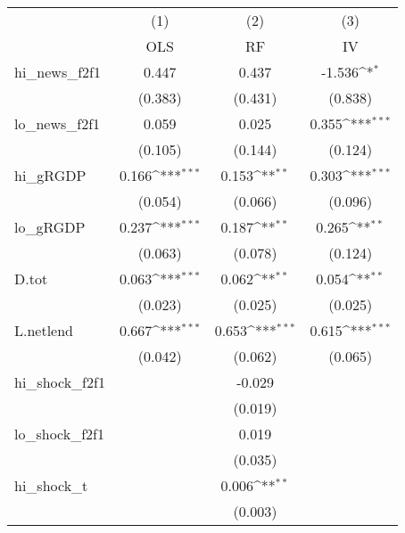 {
\def\sym#1{\ifmmode^{#1}\else\(^{#1}\)\fi}
\begin{tabular}{l*{3}{c}}
\toprule
            &\multicolumn{1}{c}{(1)}&\multicolumn{1}{c}{(2)}&\multicolumn{1}{c}{(3)}\\
            &\multicolumn{1}{c}{OLS}&\multicolumn{1}{c}{RF}&\multicolumn{1}{c}{IV}\\
\midrule
hi\_news\_f2f1&       0.447         &       0.437         &      -1.536\sym{*}  \\
            &     (0.383)         &     (0.431)         &     (0.838)         \\
\addlinespace
lo\_news\_f2f1&       0.059         &       0.025         &       0.355\sym{***}\\
            &     (0.105)         &     (0.144)         &     (0.124)         \\
\addlinespace
hi\_gRGDP    &       0.166\sym{***}&       0.153\sym{**} &       0.303\sym{***}\\
            &     (0.054)         &     (0.066)         &     (0.096)         \\
\addlinespace
lo\_gRGDP    &       0.237\sym{***}&       0.187\sym{**} &       0.265\sym{**} \\
            &     (0.063)         &     (0.078)         &     (0.124)         \\
\addlinespace
D.tot       &       0.063\sym{***}&       0.062\sym{**} &       0.054\sym{**} \\
            &     (0.023)         &     (0.025)         &     (0.025)         \\
\addlinespace
L.netlend   &       0.667\sym{***}&       0.653\sym{***}&       0.615\sym{***}\\
            &     (0.042)         &     (0.062)         &     (0.065)         \\
\addlinespace
hi\_shock\_f2f1&                     &      -0.029         &                     \\
            &                     &     (0.019)         &                     \\
\addlinespace
lo\_shock\_f2f1&                     &       0.019         &                     \\
            &                     &     (0.035)         &                     \\
\addlinespace
hi\_shock\_t  &                     &       0.006\sym{**} &                     \\
            &                     &     (0.003)         &                     \\

\end{tabular}}
